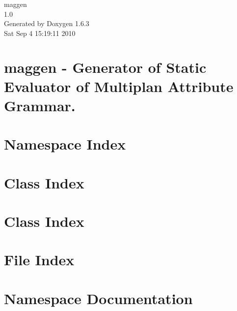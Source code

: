 \documentclass[a4paper]{book}
\begin{document}
\hypersetup{pageanchor=false}
\begin{titlepage}
\vspace*{7cm}
\begin{center}
{\Large maggen \\[1ex]\large 1.0 }\\
\vspace*{1cm}
{\large Generated by Doxygen 1.6.3}\\
\vspace*{0.5cm}
{\small Sat Sep 4 15:19:11 2010}\\
\end{center}
\end{titlepage}
\clearemptydoublepage
{}
\tableofcontents
\clearemptydoublepage
{}
\hypersetup{pageanchor=true}
\chapter{maggen -\/ Generator of Static Evaluator of Multiplan Attribute Grammar.}
\label{index}\hypertarget{index}{}
\chapter{Namespace Index}

\chapter{Class Index}

\chapter{Class Index}

\chapter{File Index}

\chapter{Namespace Documentation}


\end{document}

